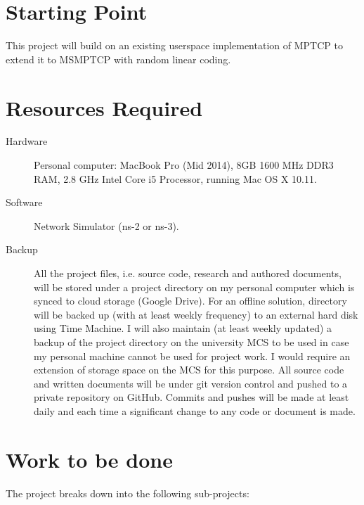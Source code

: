 \documentclass[12pt,a4paper,twoside]{article}
\begin{document}
\section*{Starting Point}

This project will build on an existing userspace implementation of MPTCP to extend it to MSMPTCP with random linear coding.

\section*{Resources Required}

\begin{description}
  \item[Hardware] Personal computer: MacBook Pro (Mid 2014), 8GB 1600 MHz DDR3 RAM, 2.8 GHz Intel Core i5 Processor, running Mac OS X 10.11.
  \item[Software] Network Simulator (ns-2 or ns-3).
  \item[Backup] All the project files, i.e. source code, research and authored documents, will be stored under a project directory on my personal computer which is synced to cloud storage (Google Drive). For an offline solution, directory will be backed up (with at least weekly frequency) to an external hard disk using Time Machine. I will also maintain (at least weekly updated) a backup of the project directory on the university MCS to be used in case my personal machine cannot be used for project work. I would require an extension of storage space on the MCS for this purpose. All source code and written documents will be under git version control and pushed to a private repository on GitHub. Commits and pushes will be made at least daily and each time a significant change to any code or document is made. 
\end{description}

\section*{Work to be done}

The project breaks down into the following sub-projects:
\end{document}
